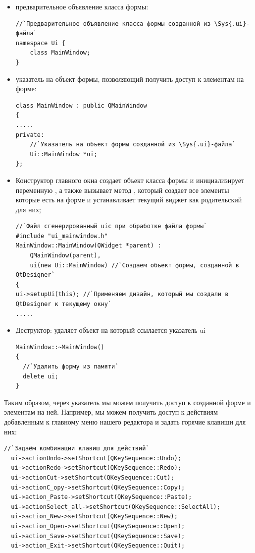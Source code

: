 \begin{itemize}
\item предварительное объявление класса формы: 
\begin{lstlisting}
//`Предварительное объявление класса формы созданной из \Sys{.ui}-файла`
namespace Ui {
    class MainWindow;
}
\end{lstlisting}

\item указатель на объект формы, позволяющий получить доступ к элементам на форме: 
\begin{lstlisting}
class MainWindow : public QMainWindow
{
.....
private:
    //`Указатель на объект формы созданной из \Sys{.ui}-файла` 
    Ui::MainWindow *ui;    
};
\end{lstlisting}

\item Конструктор главного окна создает объект класса формы и инициализирует переменную , 
а также вызывает метод , который создает все элементы которые есть на форме и 
устанавливает текущий виджет как родительский для них; 
\begin{lstlisting}
//`Файл сгенерированный uic при обработке файла формы`
#include "ui_mainwindow.h"
MainWindow::MainWindow(QWidget *parent) :
    QMainWindow(parent),
    ui(new Ui::MainWindow) //`Создаем объект формы, созданной в QtDesigner` 
{    
ui->setupUi(this); //`Применяем дизайн, который мы создали в QtDesigner к текущему окну` 
.....
\end{lstlisting}

\item Деструктор: удаляет объект на который ссылается указатель ui 
\begin{lstlisting}
MainWindow::~MainWindow()
{
  //`Удалить форму из памяти`
  delete ui;
}
\end{lstlisting}
\end{itemize}

Таким образом, через указатель  мы можем получить доступ к созданной форме и элементам на ней. 
Например, мы можем
получить доступ к действиям добавленным к главному меню нашего редактора и задать 
горячие клавиши для них:
\begin{lstlisting} 
//`Задаём комбинации клавиш для действий`
  ui->actionUndo->setShortcut(QKeySequence::Undo);
  ui->actionRedo->setShortcut(QKeySequence::Redo);
  ui->actionCut->setShortcut(QKeySequence::Cut);
  ui->actionC_opy->setShortcut(QKeySequence::Copy);
  ui->action_Paste->setShortcut(QKeySequence::Paste);
  ui->actionSelect_all->setShortcut(QKeySequence::SelectAll);
  ui->action_New->setShortcut(QKeySequence::New);
  ui->action_Open->setShortcut(QKeySequence::Open);
  ui->action_Save->setShortcut(QKeySequence::Save);
  ui->action_Exit->setShortcut(QKeySequence::Quit);
\end{lstlisting}

